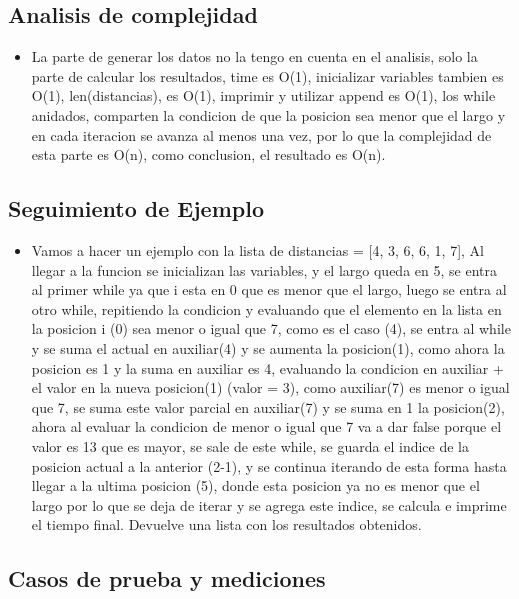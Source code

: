 \documentclass[a4paper, 12pt]{article}
\begin{document}
\subsection{Analisis de complejidad}

\begin{itemize}
    \item La parte de generar los datos no la tengo en cuenta en el analisis, solo la parte de calcular los resultados, time es O(1), inicializar variables tambien es O(1), len(distancias), es O(1), imprimir y utilizar append es O(1), los while anidados, comparten la condicion de que la posicion sea menor que el largo y en cada iteracion se avanza al menos una vez, por lo que la complejidad de esta parte es O(n), como conclusion, el resultado es O(n).

\end{itemize}

\subsection{Seguimiento de Ejemplo}
\begin{itemize}
    \item Vamos a hacer un ejemplo con la lista de distancias = [4, 3, 6, 6, 1, 7], Al llegar a la funcion se inicializan las variables, y el largo queda en 5, se entra al primer while ya que i esta en 0 que es menor que el largo, luego se entra al otro while, repitiendo la condicion y evaluando que el elemento en la lista en la posicion i (0) sea menor o igual que 7, como es el caso (4), se entra al while y se suma el actual en auxiliar(4) y se aumenta la posicion(1), como ahora la posicion es 1 y la suma en auxiliar es 4, evaluando la condicion en auxiliar + el valor en la nueva posicion(1) (valor = 3), como auxiliar(7) es menor o igual que 7, se suma este  valor parcial en auxiliar(7) y se suma en 1 la posicion(2), ahora al evaluar la condicion de menor o igual que 7 va a dar false porque el valor es 13 que es mayor, se sale de este while, se guarda el indice de la posicion actual a la anterior (2-1), y se continua iterando de esta forma hasta llegar a la ultima posicion (5), donde esta posicion ya no es menor que el largo por lo que se deja de iterar y se agrega este indice, se calcula e imprime el tiempo final. Devuelve una lista con los resultados obtenidos.
\end{itemize}


\subsection{Casos de prueba y mediciones}
\end{document}
